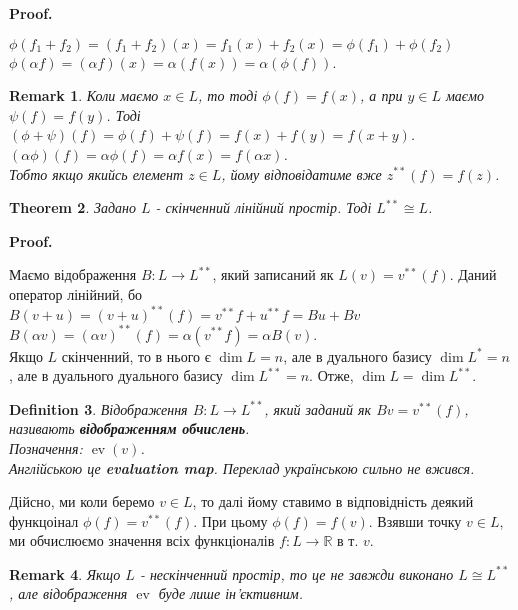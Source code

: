 \documentclass[a4paper, 10pt]{article}
\makeatletter
\theoremstyle{theoremdd}
\newtheorem{theorem}{Theorem}[subsection]
\newtheorem{definition}[theorem]{Definition}
\newtheorem{remark}[theorem]{Remark}
\DeclareMathOperator{\evaluation}{ev}
\renewenvironment{proof}[1][Proof.\\]{\par
\pushQED{\hfill \qed}%
\normalfont \topsep6\p@\@plus6\p@\relax
\trivlist
\item\relax
{\bfseries
#1\@addpunct{.}}\hspace\labelsep\ignorespaces
}{%
\popQED\endtrivlist\@endpefalse
}
\makeatother
\begin{document}
\begin{proof}
$\phi(f_1+f_2) = (f_1+f_2)(x) = f_1(x) + f_2(x) = \phi(f_1) + \phi(f_2)$\\
$\phi(\alpha f) = (\alpha f)(x) = \alpha (f(x)) = \alpha (\phi(f))$.
\end{proof}

\begin{remark}
Коли маємо $x \in L$, то тоді $\phi(f) = f(x)$, а при $y \in L$ маємо $\psi(f) = f(y)$. Тоді\\
$(\phi+\psi)(f) = \phi(f) + \psi(f) = f(x) + f(y) = f(x+y)$.\\
$(\alpha \phi)(f) = \alpha \phi(f) = \alpha f(x) = f(\alpha x)$.\\
Тобто якщо якийсь елемент $z \in L$, йому відповідатиме вже $z^{**}(f) = f(z)$.
\end{remark}

\begin{theorem}
Задано $L$ - скінченний лінійний простір. Тоді $L^{**} \cong L$.
\end{theorem}

\begin{proof}
Маємо відображення $B \colon L \to L^{**}$, який записаний як $L(v) = v^{**}(f)$. Даний оператор лінійний, бо\\
$B(v+u) = (v+u)^{**}(f) = v^{**}f + u^{**}f = Bu + Bv$\\
$B(\alpha v) = (\alpha v)^{**}(f) = \alpha (v^{**}f) = \alpha B(v)$.\\
Якщо $L$ скінченний, то в нього є $\dim L = n$, але в дуального базису $\dim L^{*} = n$, але в дуального дуального базису $\dim L^{**} = n$. Отже, $\dim L = \dim L^{**}$.
\end{proof}

\begin{definition}
Відображення $B \colon L \to L^{**}$, який заданий як $Bv = v^{**}(f)$, називають \textbf{відображенням обчислень}.\\
Позначення: $\evaluation(v)$.\\
Англійською це \textbf{evaluation map}. Переклад українською сильно не вжився.
\end{definition}
\noindent
Дійсно, ми коли беремо $v \in L$, то далі йому ставимо в відповідність деякий функцоінал $\phi(f) = v^{**}(f)$. При цьому $\phi(f) = f(v)$. Взявши точку $v \in L$, ми обчислюємо значення всіх функціоналів $f \colon L \to \mathbb{R}$ в т. $v$.
\begin{remark}
Якщо $L$ - нескінченний простір, то це не завжди виконано $L \cong L^{**}$, але відображення $\evaluation$ буде лише ін'єктивним.
\end{remark}
\end{document}
